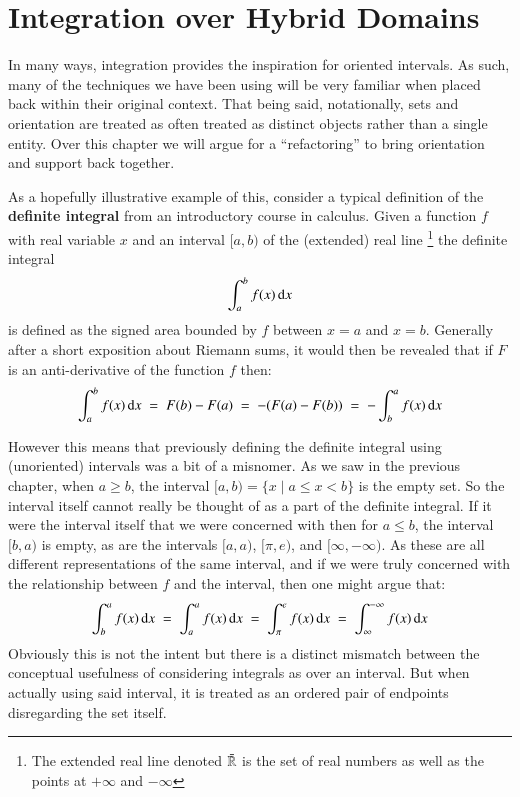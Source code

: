 \chapter{Integration over Hybrid Domains}
\label{chp:Integration}


%
%


In many ways, integration provides the inspiration for oriented intervals.
As such, many of the techniques we have been using will be very familiar when placed back within their original context.
That being said, notationally, sets and orientation are treated as often treated as distinct objects rather than a single entity.
Over this chapter we will argue for a ``refactoring'' to bring orientation and support back together.


As a hopefully illustrative example of this, consider a typical definition of the \textbf{definite integral} from an introductory
course in calculus.
Given a function $f$ with real variable $x$ and an interval $[a,b)$ of the (extended) real line
\footnote{ The extended real line denoted $\bar{\mathbb{R}}$ is the set of real numbers as well as the points at 
$+\infty$ and $-\infty$} the definite integral
\begin{equation*}
	\int_a^b f(x) \mathop{}\!\mathrm{d} x
\end{equation*}
is defined as the signed area bounded by $f$ between $x=a$ and $x=b$.
Generally after a short exposition about Riemann sums, it would then be revealed that if $F$ is an anti-derivative of the
 function $f$ then:
\begin{equation*}
	\int_a^b f(x) \mathop{}\!\mathrm{d} x \;=\; F(b)-F(a) \;=\; - (F(a)-F(b)) \;=\; - \int_b^a f(x) \mathop{}\!\mathrm{d} x
\end{equation*}


However this means that previously defining the definite integral using (unoriented) intervals was a bit of a misnomer.
As we saw in the previous chapter, when $a \geq b$, the interval $[a,b) = \{ x \;|\; a \leq x < b \}$ is the empty set.
So the interval itself cannot really be thought of as a part of the definite integral.
If it were the interval itself that we were concerned with then for $a \leq b$, the interval $[b,a)$ is empty,
as are the intervals $[a,a)$, $[\pi, e)$, and $[\infty, -\infty)$.
As these are all different representations of the same interval, and if we were truly concerned with 
the relationship between $f$ and the interval, then one might argue that:
\begin{equation*}
	\int_b^a f(x) \mathop{}\!\mathrm{d} x \;=\; \int_a^a f(x) \mathop{}\!\mathrm{d} x \;=\; \int_\pi^e f(x)\mathop{}\!\mathrm{d} x \;=\; \int_\infty^{-\infty} f(x) \mathop{}\!\mathrm{d} x
\end{equation*}
Obviously this is not the intent but there is a distinct mismatch between the conceptual usefulness of considering
integrals as over an interval.
But when actually using said interval, it is treated as an ordered pair of endpoints disregarding the set itself.


